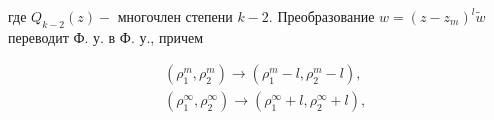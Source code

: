 \documentclass[10pt]{article}
\begin{document}
где $Q_{k-2}(z)-$ многочлен степени $k-2$. Преобразование $w=\left(z-z_{m}\right)^{l} \tilde{w}$ переводит Ф. у. в Ф. у., причем



\[

\begin{aligned}

& \left(\rho_{1}^{m}, \rho_{2}^{m}\right) \longrightarrow\left(\rho_{1}^{m}-l, \rho_{2}^{m}-l\right), \\

& \left(\rho_{1}^{\infty}, \rho_{2}^{\infty}\right) \longrightarrow\left(\rho_{1}^{\infty}+l, \rho_{2}^{\infty}+l\right),

\end{aligned}

\]
\end{document}
